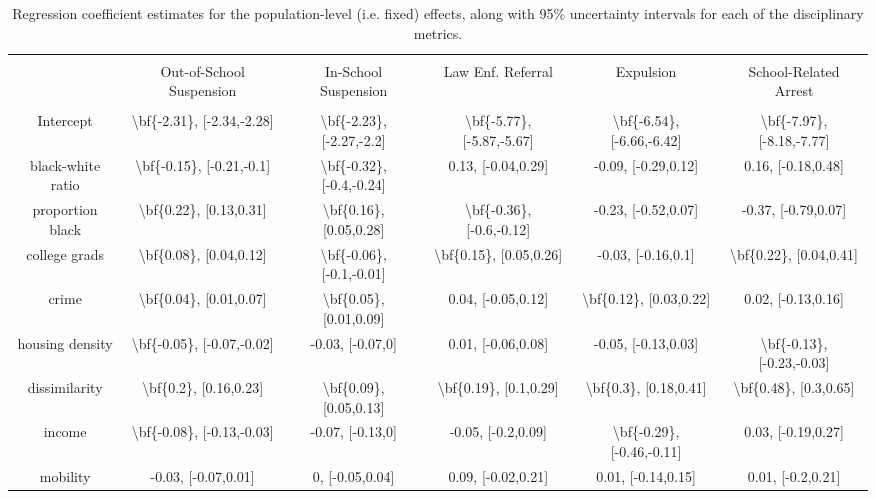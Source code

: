 \documentclass[9pt,twocolumn,twoside,lineno]{pnas-new}
\begin{document}
\begin{table}[!htbp] \centering 
  \caption{Regression coefficient estimates for the population-level (i.e. fixed) effects, along with 95\% uncertainty intervals for each of the disciplinary metrics.} 
  \label{tab:reg-coefs} 
\begin{tabular}{@{\extracolsep{5pt}} cccccc} 
\\[-1.8ex]\hline 
\hline \\[-1.8ex] 
 & Out-of-School Suspension & In-School Suspension & Law Enf. Referral & Expulsion & School-Related Arrest \\ 
\hline \\[-1.8ex] 
Intercept & \textbackslash bf\{-2.31\}, [-2.34,-2.28] & \textbackslash bf\{-2.23\}, [-2.27,-2.2] & \textbackslash bf\{-5.77\}, [-5.87,-5.67] & \textbackslash bf\{-6.54\}, [-6.66,-6.42] & \textbackslash bf\{-7.97\}, [-8.18,-7.77] \\ 
black-white ratio & \textbackslash bf\{-0.15\}, [-0.21,-0.1] & \textbackslash bf\{-0.32\}, [-0.4,-0.24] & 0.13, [-0.04,0.29] & -0.09, [-0.29,0.12] & 0.16, [-0.18,0.48] \\ 
proportion black & \textbackslash bf\{0.22\}, [0.13,0.31] & \textbackslash bf\{0.16\}, [0.05,0.28] & \textbackslash bf\{-0.36\}, [-0.6,-0.12] & -0.23, [-0.52,0.07] & -0.37, [-0.79,0.07] \\ 
college grads & \textbackslash bf\{0.08\}, [0.04,0.12] & \textbackslash bf\{-0.06\}, [-0.1,-0.01] & \textbackslash bf\{0.15\}, [0.05,0.26] & -0.03, [-0.16,0.1] & \textbackslash bf\{0.22\}, [0.04,0.41] \\ 
crime & \textbackslash bf\{0.04\}, [0.01,0.07] & \textbackslash bf\{0.05\}, [0.01,0.09] & 0.04, [-0.05,0.12] & \textbackslash bf\{0.12\}, [0.03,0.22] & 0.02, [-0.13,0.16] \\ 
housing density & \textbackslash bf\{-0.05\}, [-0.07,-0.02] & -0.03, [-0.07,0] & 0.01, [-0.06,0.08] & -0.05, [-0.13,0.03] & \textbackslash bf\{-0.13\}, [-0.23,-0.03] \\ 
dissimilarity & \textbackslash bf\{0.2\}, [0.16,0.23] & \textbackslash bf\{0.09\}, [0.05,0.13] & \textbackslash bf\{0.19\}, [0.1,0.29] & \textbackslash bf\{0.3\}, [0.18,0.41] & \textbackslash bf\{0.48\}, [0.3,0.65] \\ 
income & \textbackslash bf\{-0.08\}, [-0.13,-0.03] & -0.07, [-0.13,0] & -0.05, [-0.2,0.09] & \textbackslash bf\{-0.29\}, [-0.46,-0.11] & 0.03, [-0.19,0.27] \\ 
mobility & -0.03, [-0.07,0.01] & 0, [-0.05,0.04] & 0.09, [-0.02,0.21] & 0.01, [-0.14,0.15] & 0.01, [-0.2,0.21] \\ 

\end{tabular}
\end{table}
\end{document}

